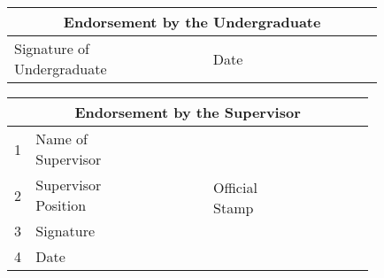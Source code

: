 \begin{center}
	\begin{tabular}{|m{0.29\linewidth}  |m{0.19\linewidth}  |m{0.05\linewidth}  |m{0.3\linewidth}  |}
		\hline 
		\multicolumn{4}{|c|}{\textbf{Endorsement by the Undergraduate}}\\ \hline
		Signature of Undergraduate && Date&\\[5mm]\hline		
	\end{tabular}
\end{center}

\begin{center}
	\begin{tabular}{|m{0.03\linewidth}  |m{0.24\linewidth}|  m{0.24\linewidth}|m{0.02\linewidth}|m{0.28\linewidth}|}
		\hline 
		\multicolumn{5}{|c|}{\textbf{Endorsement by the Supervisor}}\\ \hline
		1 & Name of Supervisor & & \multirow{4}{*}{\begin{sideways} Official Stamp \end{sideways}}& \multirow{4}{*}{}\\[1mm]
		 
	\cline{1-3}	2 & Supervisor Position & & & \\[1mm] 
	\cline{1-3}	3 & Signature & &&  \\[1mm] 
	\cline{1-3}		4 & Date & && \\[1mm] \hline
	\end{tabular}
\end{center}